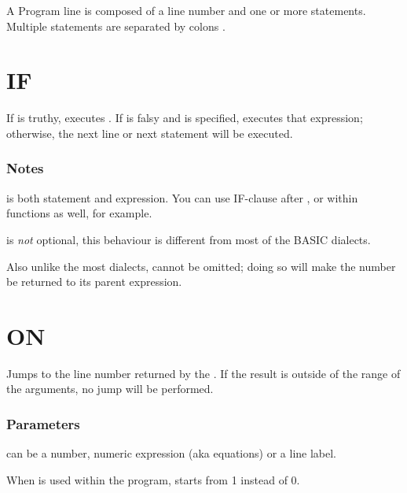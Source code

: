 \label{statements}

A Program line is composed of a line number and one or more statements. Multiple statements are separated by colons \code{:}.

\section{IF}


If  is truthy, executes . If  is falsy and  is specified, executes that expression; otherwise, the next line or next statement will be executed.

\subsubsection*{Notes}

\begin{itemlist}
\item {} is both statement and expression. You can use IF-clause after , or within functions as well, for example.
\item {} is \emph{not} optional, this behaviour is different from most of the BASIC dialects.
\item Also unlike the most dialects,  cannot be omitted; doing so will make the number be returned to its parent expression.
\end{itemlist}

\section{ON}


Jumps to the line number returned by the . If the result is outside of the range of the arguments, no jump will be performed.

\subsubsection*{Parameters}

\begin{itemlist}
\item {} can be a number, numeric expression (aka equations) or a line label.
\item When  is used within the program,  starts from 1 instead of 0.
\end{itemlist}

